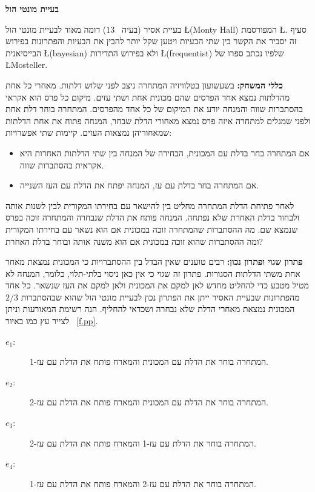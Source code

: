 


\begin{center}
\textbf{\LARGE בעיית מונטי הול}
\end{center}



בעיית אסיר (בעיה%
~$13$)
דומה מאוד לבעיית מונטי הול
\L{(Monty Hall)}
המפורסמת
\L{\cite{carlton,jason}}.
סעיף זה יסביר את הקשר בין שתי הבעיות ויטען שקל יותר להבין את הבעיות והפתרונות בפירוש הבייסיאנית 
\L{(bayesian)}
ולא בפירוש התדירות
\L{(frequentist)}
שלפיו נכתב ספרו של
\L{Mosteller}.

\textbf{כללי המשחק:}
בשעשועון בטלוויזיה המתחרה ניצב לפני שלוש דלתות. מאחרי כל אחת מהדלתות נמצא אחד הפרסים שהם מכונית אחת ושתי עזים. מיקום כל פרס הוא אקראי בהסתברות שווה והמנחה יודע את המיקום של כל אחד מהפרסים. המתחרה בוחר דלת אחת ולפני שמגלים למתחרה איזה פרס נמצא מאחורי הדלת שבחר, המנחה פתוח את אחת הדלתות שמאחוריהן נמצאות העזים. קיימות שתי אפשרויות:
\begin{itemize}
\item
אם המתחרה בחר בדלת עם המכונית, הבחירה של המנחה בין שתי הדלתות האחרות היא אקראית בהסתברות שווה.
\item
אם המתחרה בחר בדלת עם עז, המנחה יפתח את הדלת עם העז השנייה.
\end{itemize}
לאחר פתיחת הדלת המתחרה מחליט בין להישאר עם בחירתו המקורית לבין לשנות אותה ולבחור בדלת האחרת שלא נפתחה. המנחה פותח את הדלת שנבחרה והמתחרה זוכה בפרס שנמצא שם. מה ההסתברות שהמתחרה זוכה במכונית אם הוא נשאר עם בחירתו המקורית ומה ההסתברות שהוא זוכה במכונית אם הוא משנה אותה ובוחר בדלת האחרת?

\textbf{פתרון שגוי ופתרון נכון:} 
רבים טוענים שאין הבדל בין ההסתברויות כי המכונית נמצאת מאחר אחת משתי הדלתות הסגורות. פתרון זה שגוי כי אין כאן ניסוי בלתי-תלוי, כלומר, המנחה לא מטיל מטבע כדי להחליט מחדש לאן למקם את המכונית ולאן למקם את העז שנשאר. כל אחד מהפתרונות שבעיית האסיר ייתן את הפתרון נכון לבעיית מונטי הול שהוא שבהסתברות 
$2/3$
המכונית נמצאת מאחרי הדלת שלא נבחרה ושכדאי להחליף. הנה רשימת המאורעות וניתן לצייר עץ כמו באיור%
~\ref{f.pp}.
\begin{description}
\item[$e_1$:] 
המתחרה בוחר את הדלת עם המכונית והמארח פותח את הדלת עם עז-1.
\item[$e_2$:]
המתחרה בוחר את הדלת עם המכונית והמארח פותח את הדלת עם עז-2.
\item[$e_3$:]
המתחרה בוחר את הדלת עם עז-1 והמארח פותח את הדלת עם עז-2.
\item[$e_4$:]
המתחרה בוחר את הדלת עם עז-2 והמארח פותח את הדלת עם עז-1.
\end{description}

